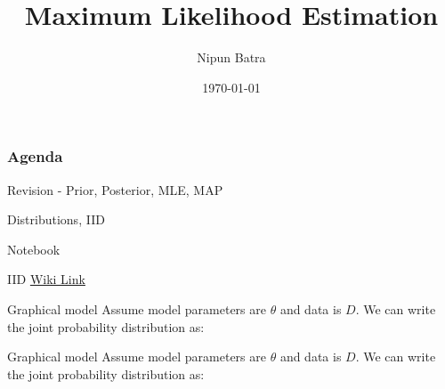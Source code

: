 \documentclass[handout]{beamer}
\begin{document}
\title{Maximum Likelihood Estimation}
\author{Nipun Batra}
\date{\today}
\maketitle
{}
\begin{frame}
    \frametitle{Agenda}
    \tableofcontents[hidesubsections]
    \end{frame}
    
\begin{section}{Revision - Prior, Posterior, MLE, MAP}
\end{section}
\begin{section}{Distributions, IID}
    \begin{frame}
        Notebook
    \end{frame}

    \begin{frame}{IID}
        \href{https://en.wikipedia.org/wiki/Independent_and_identically_distributed_random_variables}{Wiki Link}
    \end{frame}
        


    
    \begin{frame}{Graphical model}
        Assume model parameters are $\theta$ and data is $D  $. We can write the joint probability distribution as: \\
        \vspace{10pt}
        
    \end{frame}

    \begin{frame}{Graphical model}
        Assume model parameters are $\theta$ and data is $D  $. We can write the joint probability distribution as:


\end{frame}
\end{section}
\end{document}
